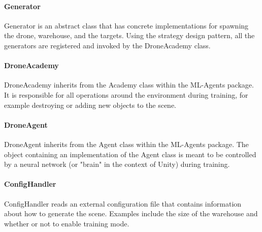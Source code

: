\paragraph{Generator} Generator is an abstract class that has concrete implementations for spawning the drone, warehouse, and the targets. Using the strategy design pattern, all the generators are registered and invoked by the DroneAcademy class.

\paragraph{DroneAcademy} DroneAcademy inherits from the Academy class within the ML-Agents package. It is responsible for all operations around the environment during training, for example destroying or adding new objects to the scene.

\paragraph{DroneAgent} DroneAgent inherits from the Agent class within the ML-Agents package. The object containing an implementation of the Agent class is meant to be controlled by a neural network (or "brain" in the context of Unity) during training.

\paragraph{ConfigHandler} ConfigHandler reads an external configuration file that contains information about how to generate the scene. Examples include the size of the warehouse and whether or not to enable training mode.

